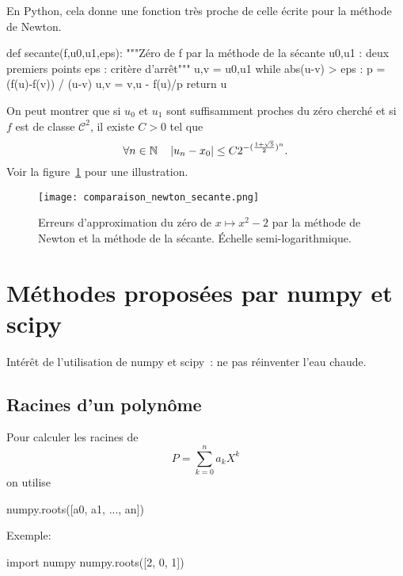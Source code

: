 \begin{center}
\resizebox{0.6\textwidth}{!}{}
\end{center}

En Python, cela donne une fonction très proche de celle écrite pour la méthode de Newton. 
\begin{pyverbatim}
def secante(f,u0,u1,eps):
    """Zéro de f par la méthode de la sécante
    u0,u1 : deux premiers points
    eps : critère d'arrêt"""
    u,v = u0,u1
    while abs(u-v) > eps : 
        p = (f(u)-f(v)) / (u-v)
        u,v = v,u - f(u)/p
    return u
\end{pyverbatim}


On peut montrer que si $u_{0}$ et $u_{1}$ sont suffisamment proches du
zéro cherché et si $f$ est de classe $\mathcal{C}^{2}$, il existe $C>0$ tel que
\begin{equation*}
  \forall n\in\mathbb{N}\quad \left|u_{n} - x_{0}\right| \leq C 2^{-(\frac{1+\sqrt5}2)^{n}}.
\end{equation*}
Voir la figure~\ref{12resolution-eq:fig:comp_sec_newton} pour une illustration.




\begin{figure}[!h]
\begin{center}
  \texttt{[image: comparaison\_newton\_secante.png]}
  \caption{Erreurs d'approximation du zéro de $x\mapsto x^2-2$ par la méthode de Newton et la méthode de la sécante. Échelle semi-logarithmique.}
  \label{12resolution-eq:fig:comp_sec_newton}
\end{center}
\end{figure}

\section{Méthodes proposées par numpy et scipy}
Intérêt de l'utilisation de numpy et scipy~: ne pas réinventer l'eau
chaude.
\subsection{Racines d'un polynôme}
Pour calculer les racines de
\begin{equation*}
 P = \sum_{k=0}^{n}a_{k}X^{k}
\end{equation*}
on utilise
\begin{pyverbatim}
numpy.roots([a0, a1, ..., an])
\end{pyverbatim}
Exemple:
\begin{pyconsole}
import numpy
numpy.roots([2, 0, 1])
\end{pyconsole}

